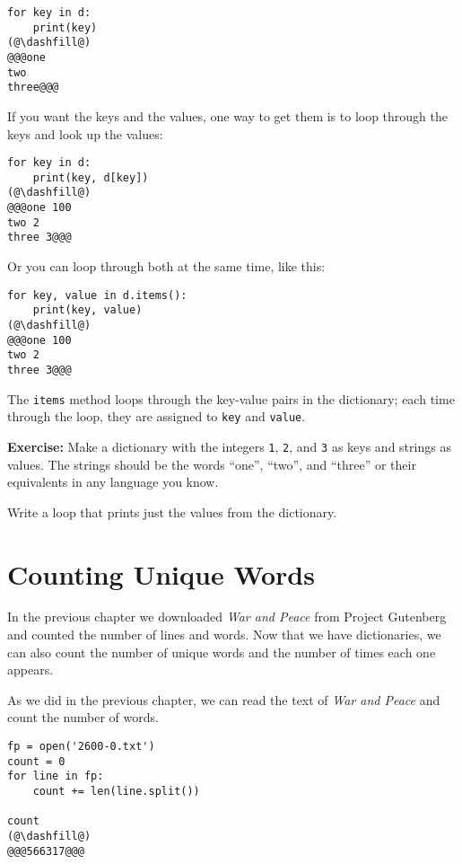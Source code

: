 \begin{lstlisting}[]
for key in d:
    print(key)
(@\dashfill@)
@@@one
two
three@@@
\end{lstlisting}

If you want the keys and the values, one way to get them is to loop
through the keys and look up the values:

\begin{lstlisting}[]
for key in d:
    print(key, d[key])
(@\dashfill@)
@@@one 100
two 2
three 3@@@
\end{lstlisting}

Or you can loop through both at the same time, like this:

\begin{lstlisting}[]
for key, value in d.items():
    print(key, value)
(@\dashfill@)
@@@one 100
two 2
three 3@@@
\end{lstlisting}

The \passthrough{\lstinline!items!} method loops through the key-value
pairs in the dictionary; each time through the loop, they are assigned
to \passthrough{\lstinline!key!} and \passthrough{\lstinline!value!}.

\textbf{Exercise:} Make a dictionary with the integers
\passthrough{\lstinline!1!}, \passthrough{\lstinline!2!}, and
\passthrough{\lstinline!3!} as keys and strings as values. The strings
should be the words ``one'', ``two'', and ``three'' or their equivalents
in any language you know.

Write a loop that prints just the values from the dictionary.

\hypertarget{counting-unique-words}{%
\section{Counting Unique Words}\label{counting-unique-words}}

In the previous chapter we downloaded \emph{War and Peace} from Project
Gutenberg and counted the number of lines and words. Now that we have
dictionaries, we can also count the number of unique words and the
number of times each one appears.

As we did in the previous chapter, we can read the text of \emph{War and
Peace} and count the number of words.

\begin{lstlisting}[]
fp = open('2600-0.txt')
count = 0
for line in fp:
    count += len(line.split())
    
count
(@\dashfill@)
@@@566317@@@
\end{lstlisting}

